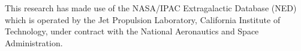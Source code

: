 \documentclass[11pt,a4paper]{article}
\begin{document}
This research has made use of the NASA/IPAC Extragalactic Database
(NED) which is operated by the Jet Propulsion Laboratory, California
Institute of Technology, under contract with the National Aeronautics
and Space Administration.




\end{document}
